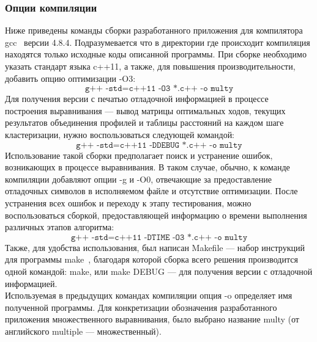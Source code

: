 \subsubsection[Опции компиляции]{\large Опции компиляции}
\hspace{\parindent} Ниже приведены команды сборки разработанного приложения для компилятора gcc~\cite{GCC} версии 4.8.4. Подразумевается что в директории где происходит компиляция находятся только исходные коды описанной программы. При сборке необходимо указать стандарт языка c++11, а также, для повышения производительности, добавить опцию оптимизации -O3:
\begin{equation*}
\texttt{g++ -std=c++11 -O3 *.c++ -o multy}
\end{equation*}
\indent Для получения версии с печатью отладочной информацией в процессе построения выравнивания --- вывод матрицы оптимальных ходов, текущих результатов объединения профилей и таблицы расстояний на каждом шаге кластеризации, нужно воспользоваться следующей командой:
\begin{equation*}
\texttt{g++ -std=c++11 -DDEBUG *.c++ -o multy}
\end{equation*}
\indent Использование такой сборки предполагает поиск и устранение ошибок, возникающих в процессе выравнивания. В таком случае, обычно, к команде компиляции добавляют опции -g и -O0, отвечающие за предоставление отладочных символов в исполняемом файле и отсутствие оптимизации. После устранения всех ошибок и переходу к этапу тестирования, можно воспользоваться сборкой, предоставляющей информацию о времени выполнения различных этапов алгоритма:
\begin{equation*}
\texttt{g++ -std=c++11 -DTIME -O3 *.c++ -o multy}
\end{equation*}
\indent Также, для удобства использования, был написан Makefile --- набор инструкций для программы make~\cite{MAKE}, благодаря которой сборка всего решения производится одной командой: make, или make DEBUG --- для получения версии с отладочной информацией.\\
\indent Используемая в предыдущих командах компиляции опция -o определяет имя полученной программы. Для конкретизации обозначения разработанного приложения множественного выравнивания, было выбрано название multy (от английского multiple --- множественный).

